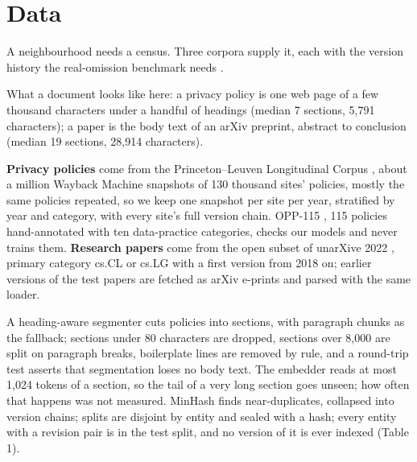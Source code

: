\documentclass[11pt,a4paper]{article}
\begin{document}
\section{Data}

A neighbourhood needs a census. Three corpora supply it, each with the version history the real-omission benchmark needs \cite{r5,r6,r7}.

What a document looks like here: a privacy policy is one web page of a few thousand characters under a handful of headings (median 7 sections, 5,791 characters); a paper is the body text of an arXiv preprint, abstract to conclusion (median 19 sections, 28,914 characters).

\textbf{Privacy policies} come from the Princeton–Leuven Longitudinal Corpus \cite{r5}, about a million Wayback Machine snapshots of 130 thousand sites' policies, mostly the same policies repeated, so we keep one snapshot per site per year, stratified by year and category, with every site's full version chain. OPP-115 \cite{r6}, 115 policies hand-annotated with ten data-practice categories, checks our models and never trains them. \textbf{Research papers} come from the open subset of unarXive 2022 \cite{r7}, primary category cs.CL or cs.LG with a first version from 2018 on; earlier versions of the test papers are fetched as arXiv e-prints and parsed with the same loader.

A heading-aware segmenter cuts policies into sections, with paragraph chunks as the fallback; sections under 80 characters are dropped, sections over 8,000 are split on paragraph breaks, boilerplate lines are removed by rule, and a round-trip test asserts that segmentation loses no body text. The embedder reads at most 1,024 tokens of a section, so the tail of a very long section goes unseen; how often that happens was not measured. MinHash finds near-duplicates, collapsed into version chains; splits are disjoint by entity and sealed with a hash; every entity with a revision pair is in the test split, and no version of it is ever indexed (Table 1).
\end{document}
